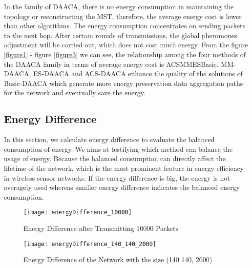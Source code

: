 \documentclass{elsarticle}
\begin{document}
In the family of DAACA, there is no energy consumption in maintaining the topology or reconstructing the MST, therefore, the average energy cost is lower than other algorithms. The energy consumption concentrates on sending packets to the next hop. After certain rounds of transmissions, the global pheromones adjustment will be carried out, which does not cost much energy. From the figure \ref{figure1} - figure \ref{figure3} we can see, the relationship among the four methods of the DAACA family in terms of average energy cost is ACSMMESBasic. MM-DAACA, ES-DAACA and ACS-DAACA enhance the quality of the solutions of Basic-DAACA which generate more energy preservation data aggregation paths for the network and eventually save the energy.

\subsection{Energy Difference} \label{EnergyDifference}
In this section, we calculate energy difference to evaluate the balanced consumption of energy. We aims at testifying which method can balance the usage of energy. Because the balanced consumption can directly affect the lifetime of the network, which is the most prominent feature in energy efficiency in wireless sensor networks. If the energy difference is big, the energy is not averagely used whereas smaller energy difference indicates the balanced energy consumption.
\begin{figure}
\centering
  \texttt{[image: energyDifference\_10000]}\\
  \caption{Energy Difference after Transmitting 10000 Packets}\label{figure4}
\end{figure}

\begin{figure}
\centering
  \texttt{[image: energyDifference\_140\_140\_2000]}\\
  \caption{Energy Difference of the Network with the size (140  140, 2000)}\label{figure5}
\end{figure}
\end{document}
